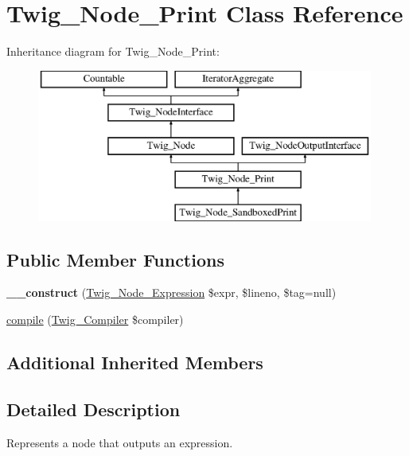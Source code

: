 \hypertarget{classTwig__Node__Print}{}\section{Twig\+\_\+\+Node\+\_\+\+Print Class Reference}
\label{classTwig__Node__Print}
Inheritance diagram for Twig\+\_\+\+Node\+\_\+\+Print\+:\begin{figure}[H]
\begin{center}
\leavevmode
\includegraphics[height=5.000000cm]{classTwig__Node__Print}
\end{center}
\end{figure}
\subsection*{Public Member Functions}
\begin{DoxyCompactItemize}
\item 
{\bfseries \+\_\+\+\_\+construct} (\hyperlink{classTwig__Node__Expression}{Twig\+\_\+\+Node\+\_\+\+Expression} \$expr, \$lineno, \$tag=null)\hypertarget{classTwig__Node__Print_aad79a9a38045df109057b3a144e51877}{}\label{classTwig__Node__Print_aad79a9a38045df109057b3a144e51877}

\item 
\hyperlink{classTwig__Node__Print_a5b047d0b5682c674790218286bc03966}{compile} (\hyperlink{classTwig__Compiler}{Twig\+\_\+\+Compiler} \$compiler)
\end{DoxyCompactItemize}
\subsection*{Additional Inherited Members}


\subsection{Detailed Description}
Represents a node that outputs an expression.

